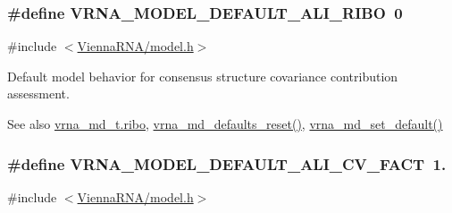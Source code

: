 \subsubsection[{V\+R\+N\+A\+\_\+\+M\+O\+D\+E\+L\+\_\+\+D\+E\+F\+A\+U\+L\+T\+\_\+\+A\+L\+I\+\_\+\+R\+I\+B\+O}]{\setlength{\rightskip}{0pt plus 5cm}\#define V\+R\+N\+A\+\_\+\+M\+O\+D\+E\+L\+\_\+\+D\+E\+F\+A\+U\+L\+T\+\_\+\+A\+L\+I\+\_\+\+R\+I\+B\+O~0}\label{group__model__details_ga64b3ab65a9ca42d4ad1d05e193083147}


{\ttfamily \#include $<$\hyperlink{model_8h}{Vienna\+R\+N\+A/model.\+h}$>$}



Default model behavior for consensus structure covariance contribution assessment. 

\begin{DoxySeeAlso}{See also}
\hyperlink{group__model__details_a3df2ae4bd9c133ef8ab92a53b1d035ec}{vrna\+\_\+md\+\_\+t.\+ribo}, \hyperlink{group__model__details_ga70834424cf804d149937de89f80ceb45}{vrna\+\_\+md\+\_\+defaults\+\_\+reset()}, \hyperlink{group__model__details_ga8ac6ff84936282436f822644bf841f66}{vrna\+\_\+md\+\_\+set\+\_\+default()} 
\end{DoxySeeAlso}
\hypertarget{group__model__details_gaaaf3d73d6abc18d3889676952bfedb96}{}
\subsubsection[{V\+R\+N\+A\+\_\+\+M\+O\+D\+E\+L\+\_\+\+D\+E\+F\+A\+U\+L\+T\+\_\+\+A\+L\+I\+\_\+\+C\+V\+\_\+\+F\+A\+C\+T}]{\setlength{\rightskip}{0pt plus 5cm}\#define V\+R\+N\+A\+\_\+\+M\+O\+D\+E\+L\+\_\+\+D\+E\+F\+A\+U\+L\+T\+\_\+\+A\+L\+I\+\_\+\+C\+V\+\_\+\+F\+A\+C\+T~1.}\label{group__model__details_gaaaf3d73d6abc18d3889676952bfedb96}


{\ttfamily \#include $<$\hyperlink{model_8h}{Vienna\+R\+N\+A/model.\+h}$>$}




